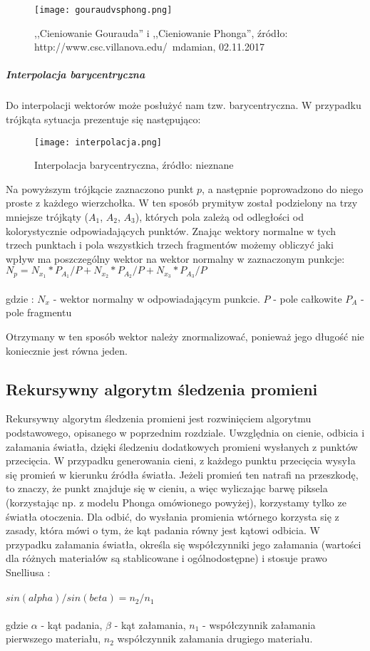 \begin{figure}[h!]
\centering
  \caption{,,Cieniowanie Gourauda'' i ,,Cieniowanie Phonga'', źródło: http://www.csc.villanova.edu/~mdamian, 02.11.2017}
  \texttt{[image: gouraudvsphong.png]}
\end{figure}


\subparagraph{Interpolacja barycentryczna}

Do interpolacji wektorów może posłużyć nam tzw. barycentryczna. W przypadku trójkąta sytuacja prezentuje się następująco:

\begin{figure}[h!]
\centering
  \caption{Interpolacja barycentryczna, źródło: nieznane}
  \texttt{[image: interpolacja.png]}
\end{figure}

Na powyższym trójkącie zaznaczono punkt $p$, a następnie poprowadzono do niego proste z każdego wierzchołka. W ten sposób prymityw został podzielony na trzy mniejsze trójkąty ($A_1$, $A_2$, $A_3$), których pola zależą od odległości od kolorystycznie odpowiadających punktów. Znając wektory normalne w tych trzech punktach i pola wszystkich trzech fragmentów możemy obliczyć jaki wpływ ma poszczególny wektor na wektor normalny w zaznaczonym punkcje:
\\
$N_p = N_{x_1} * P_{A_1}/P + N_{x_2} * P_{A_2}/P + N_{x_3} * P_{A_3}/P$\\
\\
gdzie :
$N_x$ - wektor normalny w odpowiadającym punkcie.
$P$ - pole całkowite
$P_A$ - pole fragmentu

Otrzymany w ten sposób wektor należy znormalizować, ponieważ jego długość nie koniecznie jest równa jeden.

 
\subsection{Rekursywny algorytm śledzenia promieni}

Rekursywny algorytm śledzenia promieni \cite{foley95} jest rozwinięciem algorytmu podstawowego, opisanego w poprzednim rozdziale. Uwzględnia on cienie, odbicia i załamania światła, dzięki śledzeniu dodatkowych promieni wysłanych z punktów przecięcia. W przypadku generowania cieni, z każdego punktu przecięcia wysyła się promień w kierunku źródła światła. Jeżeli promień ten natrafi na przeszkodę, to znaczy, że punkt znajduje się w cieniu, a więc wyliczając barwę piksela (korzystając np. z modelu Phonga omówionego powyżej), korzystamy tylko ze światła otoczenia. Dla odbić, do wysłania promienia wtórnego korzysta się z zasady, która mówi o tym, że kąt padania równy jest kątowi odbicia. W przypadku załamania światła, określa się współczynniki jego załamania (wartości dla różnych materiałów są stablicowane i ogólnodostępne) i stosuje prawo Snelliusa \cite{snellius}:\\
\\
$ sin(alpha)/sin(beta) = n_2/n_1$\\
\\
gdzie $\alpha$ - kąt padania, $\beta$ - kąt załamania, $n_1$ - współczynnik załamania pierwszego materiału, $n_2$ współczynnik załamania drugiego materiału.


